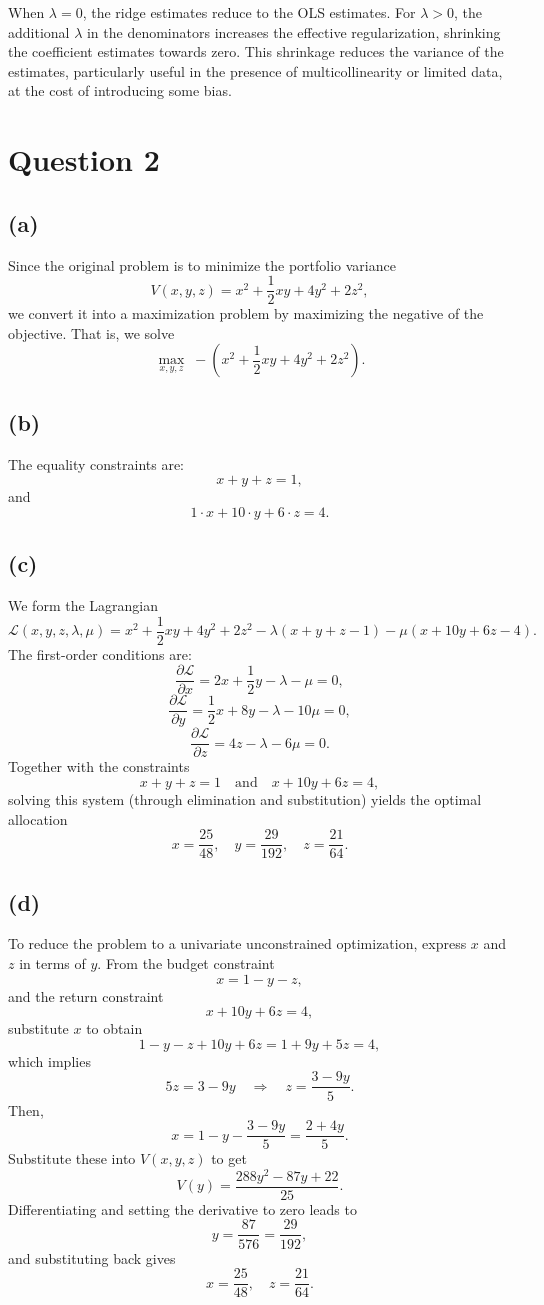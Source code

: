 \documentclass{article}
\begin{document}
When \(\lambda = 0\), the ridge estimates reduce to the OLS estimates. For \(\lambda > 0\), the additional \(\lambda\) in the denominators increases the effective regularization, shrinking the coefficient estimates towards zero. This shrinkage reduces the variance of the estimates, particularly useful in the presence of multicollinearity or limited data, at the cost of introducing some bias.

\section*{Question 2}

\subsection*{(a)}
Since the original problem is to minimize the portfolio variance
\[
V(x,y,z)=x^2+\frac{1}{2}xy+4y^2+2z^2,
\]
we convert it into a maximization problem by maximizing the negative of the objective. That is, we solve
\[
\max_{x,y,z} \; -\left(x^2+\frac{1}{2}xy+4y^2+2z^2\right).
\]

\subsection*{(b)}
The equality constraints are:
\[
x+y+z=1,
\]
and
\[
1\cdot x+10\cdot y+6\cdot z=4.
\]

\subsection*{(c)}
We form the Lagrangian
\[
\mathcal{L}(x,y,z,\lambda,\mu)=x^2+\frac{1}{2}xy+4y^2+2z^2-\lambda(x+y+z-1)-\mu(x+10y+6z-4).
\]
The first-order conditions are:
\[
\frac{\partial \mathcal{L}}{\partial x}=2x+\frac{1}{2}y-\lambda-\mu=0,
\]
\[
\frac{\partial \mathcal{L}}{\partial y}=\frac{1}{2}x+8y-\lambda-10\mu=0,
\]
\[
\frac{\partial \mathcal{L}}{\partial z}=4z-\lambda-6\mu=0.
\]
Together with the constraints
\[
x+y+z=1 \quad \text{and} \quad x+10y+6z=4,
\]
solving this system (through elimination and substitution) yields the optimal allocation
\[
x=\frac{25}{48},\quad y=\frac{29}{192},\quad z=\frac{21}{64}.
\]

\subsection*{(d)}
To reduce the problem to a univariate unconstrained optimization, express \(x\) and \(z\) in terms of \(y\). From the budget constraint
\[
x=1-y-z,
\]
and the return constraint
\[
x+10y+6z=4,
\]
substitute \(x\) to obtain
\[
1-y-z+10y+6z=1+9y+5z=4,
\]
which implies
\[
5z=3-9y \quad \Longrightarrow \quad z=\frac{3-9y}{5}.
\]
Then,
\[
x=1-y-\frac{3-9y}{5}=\frac{2+4y}{5}.
\]
Substitute these into \(V(x,y,z)\) to get
\[
V(y)=\frac{288y^2-87y+22}{25}.
\]
Differentiating and setting the derivative to zero leads to
\[
y=\frac{87}{576}=\frac{29}{192},
\]
and substituting back gives
\[
x=\frac{25}{48},\quad z=\frac{21}{64}.
\]
\end{document}
